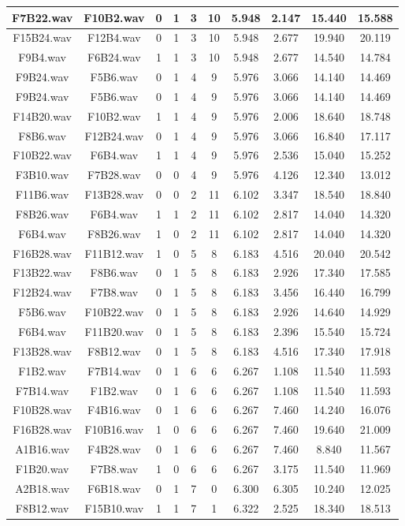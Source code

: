 \documentclass[11pt,a4paper]{book}
\begin{document}
\begin{longtable}[c]{|c|c|c|c|c|c|c|c|c|c|}
F7B22.wav&F10B2.wav&0&1&3&10&5.948&2.147&15.440&15.588\\ \hline
F15B24.wav&F12B4.wav&0&1&3&10&5.948&2.677&19.940&20.119\\ \hline
F9B4.wav&F6B24.wav&1&1&3&10&5.948&2.677&14.540&14.784\\ \hline
F9B24.wav&F5B6.wav&0&1&4&9&5.976&3.066&14.140&14.469\\ \hline
F9B24.wav&F5B6.wav&0&1&4&9&5.976&3.066&14.140&14.469\\ \hline
F14B20.wav&F10B2.wav&1&1&4&9&5.976&2.006&18.640&18.748\\ \hline
F8B6.wav&F12B24.wav&0&1&4&9&5.976&3.066&16.840&17.117\\ \hline
F10B22.wav&F6B4.wav&1&1&4&9&5.976&2.536&15.040&15.252\\ \hline
F3B10.wav&F7B28.wav&0&0&4&9&5.976&4.126&12.340&13.012\\ \hline
F11B6.wav&F13B28.wav&0&0&2&11&6.102&3.347&18.540&18.840\\ \hline
F8B26.wav&F6B4.wav&1&1&2&11&6.102&2.817&14.040&14.320\\ \hline
F6B4.wav&F8B26.wav&1&0&2&11&6.102&2.817&14.040&14.320\\ \hline
F16B28.wav&F11B12.wav&1&0&5&8&6.183&4.516&20.040&20.542\\ \hline
F13B22.wav&F8B6.wav&0&1&5&8&6.183&2.926&17.340&17.585\\ \hline
F12B24.wav&F7B8.wav&0&1&5&8&6.183&3.456&16.440&16.799\\ \hline
F5B6.wav&F10B22.wav&0&1&5&8&6.183&2.926&14.640&14.929\\ \hline
F6B4.wav&F11B20.wav&0&1&5&8&6.183&2.396&15.540&15.724\\ \hline
F13B28.wav&F8B12.wav&0&1&5&8&6.183&4.516&17.340&17.918\\ \hline
F1B2.wav&F7B14.wav&0&1&6&6&6.267&1.108&11.540&11.593\\ \hline
F7B14.wav&F1B2.wav&0&1&6&6&6.267&1.108&11.540&11.593\\ \hline
F10B28.wav&F4B16.wav&0&1&6&6&6.267&7.460&14.240&16.076\\ \hline
F16B28.wav&F10B16.wav&1&0&6&6&6.267&7.460&19.640&21.009\\ \hline
A1B16.wav&F4B28.wav&0&1&6&6&6.267&7.460&8.840&11.567\\ \hline
F1B20.wav&F7B8.wav&1&0&6&6&6.267&3.175&11.540&11.969\\ \hline
A2B18.wav&F6B18.wav&0&1&7&0&6.300&6.305&10.240&12.025\\ \hline
F8B12.wav&F15B10.wav&1&1&7&1&6.322&2.525&18.340&18.513\\ \hline

\end{longtable}
\end{document}
